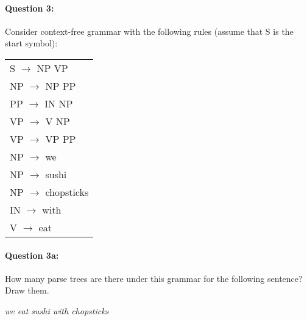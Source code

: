 \documentclass[10pt]{article}
\begin{document}
\paragraph{Question 3:} Consider context-free grammar with the following rules (assume
that S is the start symbol):
\begin{table}[H]
  \centering
  \begin{tabular}{|l|}
    \hline
    S $\rightarrow$ NP VP       \\
    NP $\rightarrow$ NP PP      \\
    PP $\rightarrow$ IN NP      \\
    VP $\rightarrow$ V NP       \\
    VP $\rightarrow$ VP PP      \\
    \hline
    NP $\rightarrow$ we         \\
    NP $\rightarrow$ sushi      \\
    NP $\rightarrow$ chopsticks \\
    IN $\rightarrow$ with       \\
    V $\rightarrow$ eat         \\
    \hline
  \end{tabular}
\end{table}




\paragraph{Question 3a:}How many parse trees are there under this grammar for the following sentence? Draw them.

\textit{we eat sushi with chopsticks}

\newpage
\end{document}
